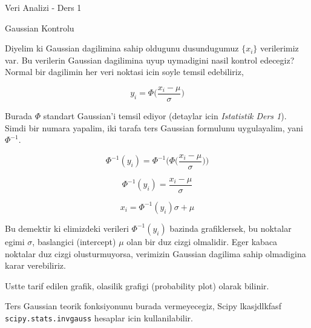 \documentclass[12pt,fleqn]{article}\usepackage{../common}
\begin{document}
Veri Analizi - Ders 1

Gaussian Kontrolu

Diyelim ki Gaussian dagilimina sahip oldugunu dusundugumuz $\{ x_i\}$
verilerimiz var. Bu verilerin Gaussian dagilimina uyup uymadigini nasil
kontrol edecegiz? Normal bir dagilimin her veri noktasi icin soyle temsil
edebiliriz,

\[ y_i = \Phi\bigg(\frac{ x_i - \mu}{\sigma}\bigg) \]

Burada $\Phi$ standart Gaussian'i temsil ediyor (detaylar icin {\em Istatistik
Ders 1}). Simdi bir numara yapalim, iki tarafa ters Gaussian formulunu
uygulayalim, yani $\Phi ^{-1} $. 

\[ \Phi ^{-1}(y_i) = \Phi ^{-1}\bigg(\Phi\bigg(\frac{ x_i - \mu}{\sigma}\bigg)\bigg) \]

\[ \Phi ^{-1}(y_i) = \frac{ x_i - \mu}{\sigma}\]

\[  x_i = \Phi^{-1}(y_i) \sigma + \mu  \]

Bu demektir ki elimizdeki verileri $\Phi^{-1}(y_i)$ bazinda grafiklersek,
bu noktalar egimi $\sigma$, baslangici (intercept) $\mu$ olan bir duz cizgi
olmalidir. Eger kabaca noktalar duz cizgi olusturmuyorsa, verimizin 
Gaussian dagilima sahip olmadigina karar verebiliriz. 

Ustte tarif edilen grafik,  olasilik grafigi (probability plot) olarak
bilinir. 

Ters Gaussian teorik fonksiyonunu burada vermeyecegiz, Scipy lkasjdlkfasf
\verb!scipy.stats.invgauss! hesaplar icin kullanilabilir.
\end{document}
